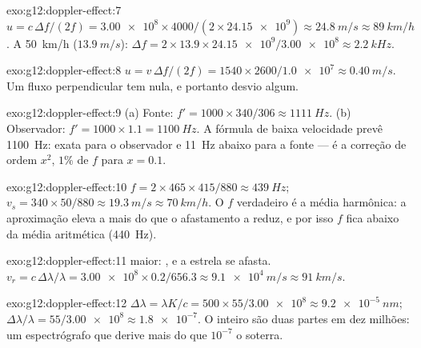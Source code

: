 \begin{solution}{exo:g12:doppler-effect:7}
$u = c\,\Delta f/(2f) = \num{3.00e8} \times 4000/(2 \times \num{24.15e9})
\approx \qty{24.8}{m/s} \approx \qty{89}{km/h}$. A \qty{50}{km/h}
($\qty{13.9}{m/s}$):
$\Delta f = 2 \times 13.9 \times \num{24.15e9}/\num{3.00e8} \approx
\qty{2.2}{kHz}$.
\end{solution}

\begin{solution}{exo:g12:doppler-effect:8}
$u = v\,\Delta f/(2f) = 1540 \times 2600/\num{1.0e7} \approx
\qty{0.40}{m/s}$. Um fluxo perpendicular tem  nula, e
portanto desvio algum.
\end{solution}

\begin{solution}{exo:g12:doppler-effect:9}
(a) Fonte: $f' = 1000 \times 340/306 \approx \qty{1111}{Hz}$.
(b) Observador: $f' = 1000 \times 1.1 = \qty{1100}{Hz}$. A fórmula de
baixa velocidade prevê \qty{1100}{Hz}: exata para o observador e
\qty{11}{Hz} abaixo para a fonte --- é a correção de ordem $x^2$, $1\%$
de $f$ para $x = 0.1$.
\end{solution}

\begin{solution}{exo:g12:doppler-effect:10}
$f = 2 \times 465 \times 415/880 \approx \qty{439}{Hz}$;
$v_s = 340 \times 50/880 \approx \qty{19.3}{m/s} \approx \qty{70}{km/h}$.
O $f$ verdadeiro é a média harmônica: a aproximação eleva a 
mais do que o afastamento a reduz, e por isso $f$ fica abaixo da média
aritmética (\qty{440}{Hz}).
\end{solution}

\begin{solution}{exo:g12:doppler-effect:11}
 maior: , e a estrela se afasta.
$v_r = c\,\Delta\lambda/\lambda = \num{3.00e8} \times 0.2/656.3 \approx
\qty{9.1e4}{m/s} \approx \qty{91}{km/s}$.
\end{solution}

\begin{solution}{exo:g12:doppler-effect:12}
$\Delta\lambda = \lambda K/c = 500 \times 55/\num{3.00e8} \approx
\qty{9.2e-5}{nm}$;
$\Delta\lambda/\lambda = 55/\num{3.00e8} \approx \num{1.8e-7}$. O 
inteiro são duas partes em dez milhões: um espectrógrafo que derive mais
do que $10^{-7}$ o soterra.
\end{solution}


